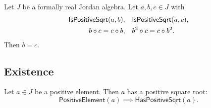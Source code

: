 \begin{theorem}
Let $J$ be a formally real Jordan algebra. Let $a, b, c \in J$ with
\begin{align*}
\mathsf{IsPositiveSqrt}(a, b), \quad &\mathsf{IsPositiveSqrt}(a, c), \\
b \circ c = c \circ b, \quad &b^{2} \circ c = c \circ b^{2}.
\end{align*}
Then $b = c$.
\end{theorem}

\subsection{Existence}

\begin{theorem}
Let $a \in J$ be a positive element. Then $a$ has a positive square root:
\[ \mathsf{PositiveElement}(a) \implies \mathsf{HasPositiveSqrt}(a). \]
\end{theorem}
